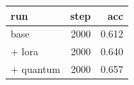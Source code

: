 %
%
\begin{tabular}{lrr}
  \toprule
  run & step & acc \\
  \midrule
  base        & 2000 & 0.612 \\
  + lora      & 2000 & 0.640 \\
  + quantum   & 2000 & 0.657 \\
  \bottomrule
\end{tabular}
